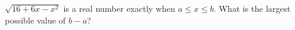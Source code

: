 $\sqrt{16+6x-x^2}$ is a real number exactly when $a\le x\le b$. What is the largest possible value of $b-a$?
